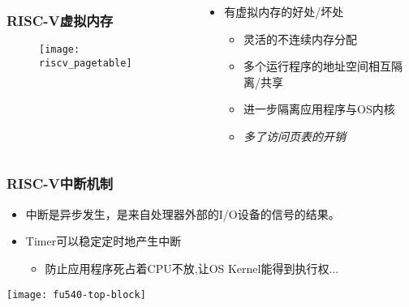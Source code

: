 
\begin{frame}[plain]
	
    \begin{columns}
    \begin{column}{0.6\textwidth}

    \frametitle{RISC-V虚拟内存}
	
	\begin{figure}
		\centering
		\texttt{[image: riscv\_pagetable]}
	\end{figure}

    \end{column}

    \begin{column}{0.4\textwidth}

	\begin{itemize}
	\item 有虚拟内存的好处/坏处
	  \begin{itemize}
		\item 灵活的不连续内存分配
		\item 多个运行程序的地址空间相互隔离/共享
		\item 进一步隔离应用程序与OS内核
		\item \textit{多了访问页表的开销} 
	  \end{itemize} 
	\end{itemize}

    \end{column}

    \end{columns}
	
	
\end{frame}


\begin{frame}[plain]
	\frametitle{RISC-V中断机制}
	\begin{itemize}
		\item 中断是异步发生，是来自处理器外部的I/O设备的信号的结果。
		
		
		\item Timer可以稳定定时地产生中断
		\begin{itemize}
			\item 防止应用程序死占着CPU不放,让OS Kernel能得到执行权...
		\end{itemize}				
		
	\end{itemize}

	\centering
	\texttt{[image: fu540-top-block]}

\end{frame}

